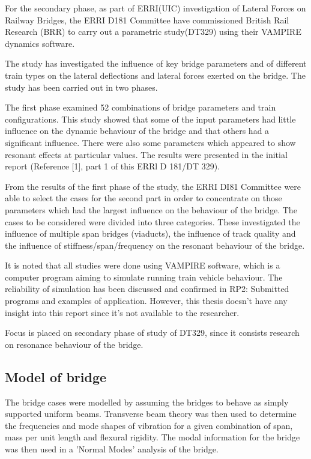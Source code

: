 \begin{appendices}
For the secondary phase, as part of ERRI(UIC) investigation of Lateral Forces on Railway Bridges, the ERRI D181 Committee have commissioned British Rail Research (BRR) to carry out a parametric study(DT329) using their VAMPIRE dynamics software. 

The study has investigated the influence of key bridge parameters and of different train types on the lateral deflections and lateral forces exerted on the bridge. The study has been carried out in two phases.

The first phase examined 52 combinations of bridge parameters and train configurations. This study showed that some of the input parameters had little influence on the dynamic behaviour of the bridge and that others had a significant influence. There were also some parameters which appeared to show resonant effects at particular values. The results were presented in the initial report (Reference [1], part 1 of this ERRl D 181/DT 329).

From the results of the first phase of the study, the ERRI DI81 Committee were able to select the cases for the second part in order to concentrate on those parameters which had the largest influence on the behaviour of the bridge. The cases to be considered were divided into three categories. These investigated the influence of multiple span bridges (viaducts), the influence of track quality and the influence of stiffness/span/frequency on the resonant behaviour of the bridge.

It is noted that all studies were done using VAMPIRE software, which is a computer program aiming to simulate running train vehicle behaviour. The reliability of simulation has been discussed and confirmed in RP2: Submitted programs and examples of application. However, this thesis doesn't have any insight into this report since it's not available to the researcher. 

Focus is placed on secondary phase of study of DT329, since it consists research on resonance behaviour of the bridge.

\subsection{Model of bridge}
The bridge cases were modelled by assuming the bridges to behave as simply supported uniform beams. Transverse beam theory was then used to determine the frequencies and mode shapes of vibration for a given combination of span, mass per unit length and flexural rigidity. The modal information for the bridge was then used in a 'Normal Modes' analysis of the bridge.


\end{appendices}
